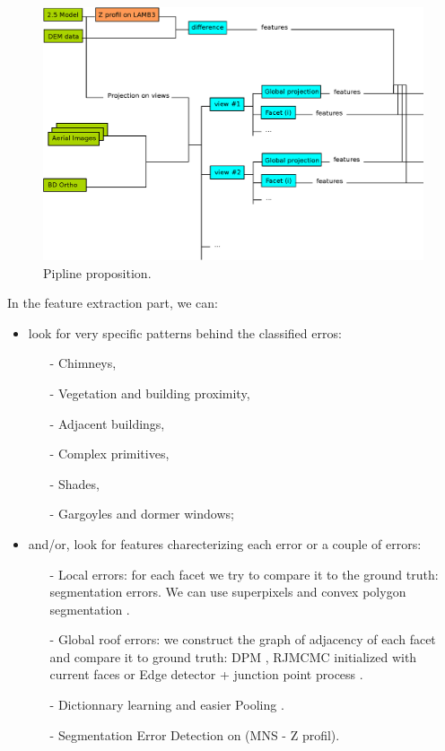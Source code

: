 \documentclass[a4paper, 11pt]{article}
\begin{document}
	\begin{figure}[H]
		\begin{center}
			\includegraphics[scale=.5]{images/vectorial/pipline.eps}
			\caption{Pipline proposition.}
			\label{fig::pipline}
		\end{center}
	\end{figure}
	
	In the feature extraction part, we can:
	\begin{itemize}
		\item look for very specific patterns behind the classified erros:
			\begin{itemize}
				\item[-] Chimneys,
				\item[-] Vegetation and building proximity,
				\item[-] Adjacent buildings,
				\item[-] Complex primitives,
				\item[-] Shades,
				\item[-] Gargoyles and dormer windows;
			\end{itemize}
		\item and/or, look for features charecterizing each error or a couple of errors:
			\begin{itemize}
				\item[-] Local errors: for each facet we try to compare it to the ground truth: segmentation errors. We can use superpixels \cite{Achanta:2012:SSC:2377349.2377556} and convex polygon segmentation \cite{duan2015image}.
				\item[-] Global roof errors: we construct the graph of adjacency of each facet and compare it to ground truth: DPM \cite{felzenszwalb2010object}, RJMCMC initialized with current faces or Edge detector + junction point process \cite{chai2013recovering}.
				\item[-] Dictionnary learning and easier Pooling \cite{bach2010sparse}.
				\item[-] Segmentation Error Detection on (MNS - Z profil).
			\end{itemize}
	\end{itemize}
	
\end{document}
